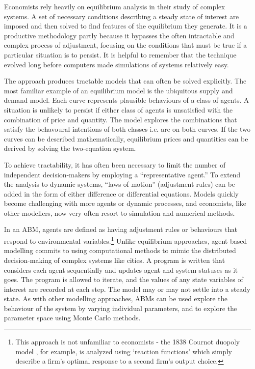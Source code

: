 {Economists rely heavily on equilibrium analysis in their study of complex systems. 
A set of necessary conditions describing a steady state of interest are imposed and then solved to find features of the equilibrium they generate. It is a productive methodology partly because it  bypasses the often intractable and complex process of adjustment, focusing on the conditions that must be true if a particular situation is to persist. It is helpful to remember that the technique evolved long before computers  made simulations of systems relatively easy.

The approach produces tractable models that can often be solved explicitly. The most familiar  example of an equilibrium model is the ubiquitous supply and demand model. Each curve represents plausible behaviours of a class of agents. A situation is unlikely to persist if either class of agents is unsatisfied with the combination of price and quantity. The model explores the combinations that satisfy the behavoural intentions of both classes i.e. are on both curves. If the two curves can be described mathematically, equilibrium prices and quantities can be derived by solving the two-equation system.

To achieve tractability, it has often been necessary to limit the number of independent decision-makers by employing a ``representative agent.'' To extend the analysis to dynamic systems, ``laws of motion'' (adjustment rules) can be added in the form of either difference or differential equations.  Models quickly become challenging with more agents or dynamic 
processes, and economists, like other modellers, now very often resort to simulation 
and numerical methods. 

In an \gls{ABM}, agents are defined as having adjustment rules or behaviours that respond to environmental variables.\footnote{This approach is not unfamiliar to economists - the 1838 Cournot duopoly model \cite{cournotRecherchesPrincipesMathematiques1968a}, for example, is analyzed using `reaction functions' which simply describe a firm's optimal response to a second firm's output choice.} 
Unlike equilibrium approaches, agent-based modelling commits to using computational methods to mimic the distributed decision-making of complex systems like cities. A program is written that considers each agent sequentially and updates agent and system statuses as it goes. The program is allowed to iterate, and the values of any state variables of interest are recorded at each step. The model may or may not settle into a steady state. As with other modelling approaches, ABMs can be used explore the behaviour of the system by varying individual parameters, and to explore the parameter space using Monte Carlo methods.

}
